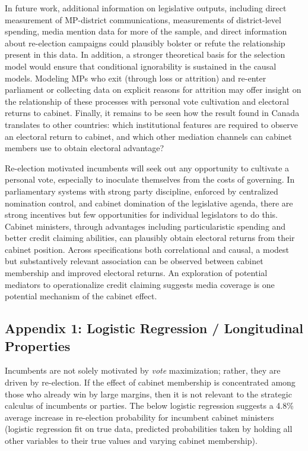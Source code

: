 \documentclass[letter,12pt]{article}
\begin{document}
In future work, additional information on legislative outputs, including direct measurement of MP-district communications, measurements of district-level spending, media mention data for more of the sample, and direct information about re-election campaigns could plausibly bolster or refute the relationship present in this data. In addition, a stronger theoretical basis for the selection model would ensure that conditional ignorability is sustained in the causal models. Modeling MPs who exit (through loss or attrition) and re-enter parliament or collecting data on explicit reasons for attrition may offer insight on the relationship of these processes with personal vote cultivation and electoral returns to cabinet. Finally, it remains to be seen how the result found in Canada translates to other countries: which institutional features are required to observe an electoral return to cabinet, and which other mediation channels can cabinet members use to obtain electoral advantage? 

Re-election motivated incumbents will seek out any opportunity to cultivate a personal vote, especially to inoculate themselves from the costs of governing. In parliamentary systems with strong party discipline, enforced by centralized nomination control, and cabinet domination of the legislative agenda, there are strong incentives but few opportunities for individual legislators to do this. Cabinet ministers, through advantages including particularistic spending and better credit claiming abilities, can plausibly obtain electoral returns from their cabinet position. Across specifications both correlational and causal, a modest but substantively relevant association can be observed between cabinet membership and improved electoral returns. An exploration of potential mediators to operationalize credit claiming suggests media coverage is one potential mechanism of the cabinet effect.

\newpage
{}

\subsection*{Appendix 1: Logistic Regression / Longitudinal Properties}
Incumbents are not solely motivated by \textit{vote} maximization; rather, they are driven by re-election. If the effect of cabinet membership is concentrated among those who already win by large margins, then it is not relevant to the strategic calculus of incumbents or parties. The below logistic regression suggests a 4.8\% average increase in re-election probability for incumbent cabinet ministers (logistic regression fit on true data, predicted probabilities taken by holding all other variables to their true values and varying cabinet membership).
\end{document}
